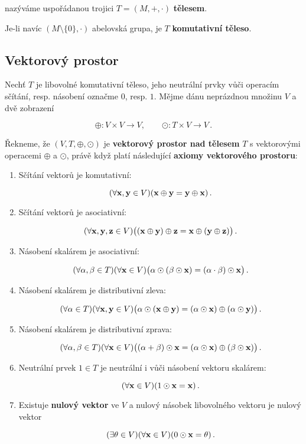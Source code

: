nazýváme uspořádanou trojici $T = (M, +, \cdot)$ \textbf{tělesem}.

Je-li navíc $(M\setminus \{0\}, \cdot)$ abelovská grupa, je $T$
\textbf{komutativní těleso}.

\subsection*{Vektorový prostor}

Nechť $T$ je libovolné komutativní těleso, jeho neutrální prvky vůči operacím
sčítání, resp. násobení označme $0$, resp. $1$. Mějme dánu neprázdnou množinu
$V$ a dvě zobrazení

\[ \oplus: V\times V\to V,\qquad \odot:T\times V\to V\,. \]

Řekneme, že $(V,T,\oplus,\odot)$ je \textbf{vektorový prostor nad tělesem} $T$ s vektorovými operacemi $\oplus$ a $\odot$, právě když platí následující \textbf{axiomy vektorového prostoru}:

\begin{enumerate}
      \item Sčítání vektorů je komutativní:

            \[ (\forall \mathbf{x},\mathbf{y}\in V)(\mathbf{x}\oplus \mathbf{y}=\mathbf{y}\oplus\mathbf{x})\,. \]

      \item Sčítání vektorů je asociativní:

            \[ (\forall \mathbf{x},\mathbf{y},\mathbf{z}\in V)\big((\mathbf{x}\oplus \mathbf{y})\oplus \mathbf{z}=\mathbf{x}\oplus(\mathbf{y}\oplus \mathbf{z})\big)\,. \]

      \item Násobení skalárem je asociativní:

            \[ (\forall\alpha,\beta\in T)(\forall \mathbf{x}\in V) \big(\alpha\odot(\beta\odot \mathbf{x})=(\alpha\cdot\beta)\odot \mathbf{x} \big)\,. \]

      \item Násobení skalárem je distributivní zleva:

            \[ (\forall\alpha\in T) (\forall \mathbf{x},\mathbf{y}\in V) \big(\alpha\odot(\mathbf{x}\oplus \mathbf{y})=(\alpha\odot \mathbf{x})\oplus(\alpha\odot \mathbf{y})\big)\,. \]

      \item Násobení skalárem je distributivní zprava:

            \[ (\forall\alpha,\beta\in T)(\forall \mathbf{x}\in V) \big((\alpha+\beta)\odot \mathbf{x}=(\alpha\odot \mathbf{x})\oplus(\beta\odot \mathbf{x})\big)\,. \]

      \item Neutrální prvek $1\in T$ je neutrální i vůči násobení vektoru skalárem:

            \[ (\forall \mathbf{x}\in V) (1\odot \mathbf{x}=\mathbf{x})\,. \]

      \item Existuje \textbf{nulový vektor} ve $V$ a nulový násobek libovolného vektoru je
            nulový vektor

            \[ (\exists\theta\in V) (\forall \mathbf{x}\in V) (0\odot \mathbf{x}=\theta)\,.\]

\end{enumerate}

